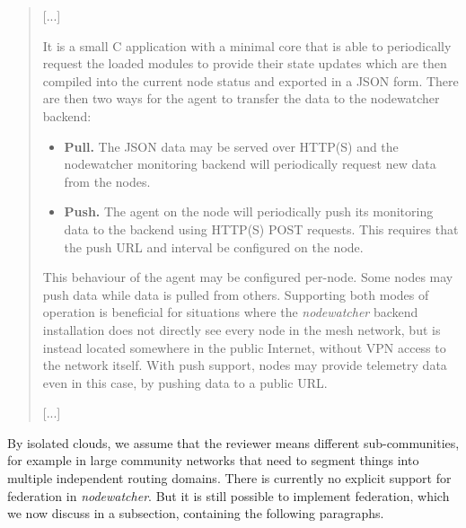 \documentclass[12pt,twoside,a4paper]{report}
\newcommand{\nodewatcher}{\textit{nodewatcher}}
\begin{document}
\begin{quote}

[...]

It is a small C application with a minimal core that is able to periodically request the loaded modules to provide their state updates which are then compiled into the current node status and exported in a JSON form.
There are then two ways for the agent to transfer the data to the nodewatcher backend:
\begin{itemize}
    \item \textbf{Pull.} The JSON data may be served over HTTP(S) and the nodewatcher monitoring backend will periodically request new data from the nodes.

    \item \textbf{Push.} The agent on the node will periodically push its monitoring data to the backend using HTTP(S) POST requests. This requires that the push URL and interval be configured on the node.
\end{itemize}

This behaviour of the agent may be configured per-node.
Some nodes may push data while data is pulled from others.
Supporting both modes of operation is beneficial for situations where the \nodewatcher{} backend installation does not directly see every node in the mesh network, but is instead located somewhere in the public Internet, without VPN access to the network itself.
With push support, nodes may provide telemetry data even in this case, by pushing data to a public URL.

[...]

\end{quote}

By isolated clouds, we assume that the reviewer means different sub-communities, for example in large community networks that need to segment things into multiple independent routing domains.
There is currently no explicit support for federation in \nodewatcher{}.
But it is still possible to implement federation, which we now discuss in a subsection, containing the following paragraphs.
\end{document}
